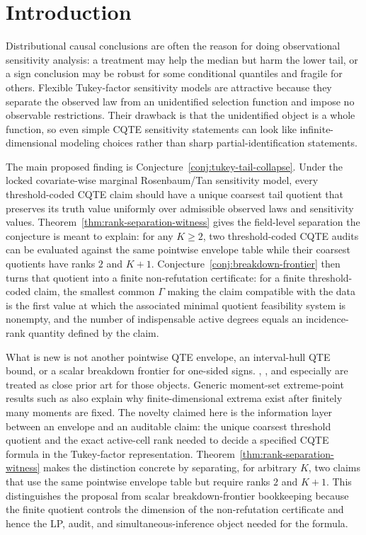 \documentclass[11pt]{article}
\theoremstyle{definition}
\theoremstyle{plain}
\theoremstyle{remark}
\begin{document}
\section{Introduction}
Distributional causal conclusions are often the reason for doing observational sensitivity analysis: a treatment may help the median but harm the lower tail, or a sign conclusion may be robust for some conditional quantiles and fragile for others.  Flexible Tukey-factor sensitivity models are attractive because they separate the observed law from an unidentified selection function and impose no observable restrictions.  Their drawback is that the unidentified object is a whole function, so even simple CQTE sensitivity statements can look like infinite-dimensional modeling choices rather than sharp partial-identification statements.

The main proposed finding is Conjecture~\ref{conj:tukey-tail-collapse}.  Under the locked covariate-wise marginal Rosenbaum/Tan sensitivity model, every threshold-coded CQTE claim should have a unique coarsest tail quotient that preserves its truth value uniformly over admissible observed laws and sensitivity values.  Theorem~\ref{thm:rank-separation-witness} gives the field-level separation the conjecture is meant to explain: for any \(K\ge2\), two threshold-coded CQTE audits can be evaluated against the same pointwise envelope table while their coarsest quotients have ranks \(2\) and \(K+1\).  Conjecture~\ref{conj:breakdown-frontier} then turns that quotient into a finite non-refutation certificate: for a finite threshold-coded claim, the smallest common \(\Gamma\) making the claim compatible with the data is the first value at which the associated minimal quotient feasibility system is nonempty, and the number of indispensable active degrees equals an incidence-rank quantity defined by the claim.

What is new is not another pointwise QTE envelope, an interval-hull QTE bound, or a scalar breakdown frontier for one-sided signs.  \citet{MastenPoirier2020}, \citet{MastenPoirierRen2025}, and especially \citet{Wang2026} are treated as close prior art for those objects.  Generic moment-set extreme-point results such as \citet{Winkler1988} also explain why finite-dimensional extrema exist after finitely many moments are fixed.  The novelty claimed here is the information layer between an envelope and an auditable claim: the unique coarsest threshold quotient and the exact active-cell rank needed to decide a specified CQTE formula in the Tukey-factor representation.  Theorem~\ref{thm:rank-separation-witness} makes the distinction concrete by separating, for arbitrary \(K\), two claims that use the same pointwise envelope table but require ranks \(2\) and \(K+1\).  This distinguishes the proposal from scalar breakdown-frontier bookkeeping because the finite quotient controls the dimension of the non-refutation certificate and hence the LP, audit, and simultaneous-inference object needed for the formula.
\end{document}
